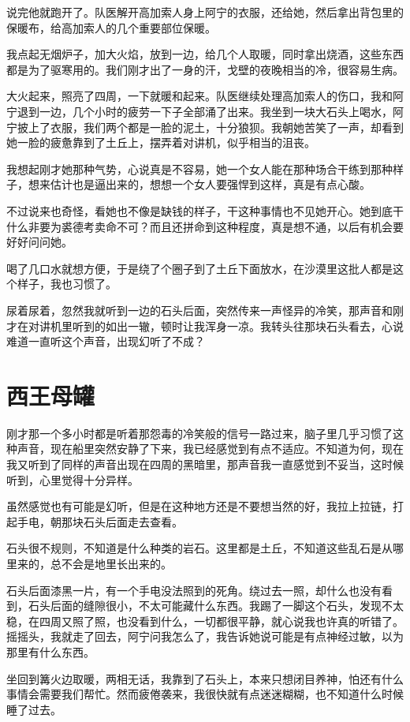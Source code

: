 说完他就跑开了。队医解开高加索人身上阿宁的衣服，还给她，然后拿出背包里的保暖布，给高加索人的几个重要部位保暖。

我点起无烟炉子，加大火焰，放到一边，给几个人取暖，同时拿出烧酒，这些东西都是为了驱寒用的。我们刚才出了一身的汗，戈壁的夜晚相当的冷，很容易生病。

大火起来，照亮了四周，一下就暖和起来。队医继续处理高加索人的伤口，我和阿宁退到一边，几个小时的疲劳一下子全部涌了出来。我坐到一块大石头上喝水，阿宁披上了衣服，我们两个都是一脸的泥土，十分狼狈。我朝她苦笑了一声，却看到她一脸的疲惫靠到了土丘上，摆弄着对讲机，似乎相当的沮丧。

我想起刚才她那种气势，心说真是不容易，她一个女人能在那种场合干练到那种样子，想来估计也是逼出来的，想想一个女人要强悍到这样，真是有点心酸。

不过说来也奇怪，看她也不像是缺钱的样子，干这种事情也不见她开心。她到底干什么非要为裘德考卖命不可？而且还拼命到这种程度，真是想不通，以后有机会要好好问问她。

喝了几口水就想方便，于是绕了个圈子到了土丘下面放水，在沙漠里这批人都是这个样子，我也习惯了。

尿着尿着，忽然我就听到一边的石头后面，突然传来一声怪异的冷笑，那声音和刚才在对讲机里听到的如出一辙，顿时让我浑身一凉。我转头往那块石头看去，心说难道一直听这个声音，出现幻听了不成？

\chapter{西王母罐}

刚才那一个多小时都是听着那怨毒的冷笑般的信号一路过来，脑子里几乎习惯了这种声音，现在船里突然安静了下来，我已经感觉到有点不适应。不知道为何，现在我又听到了同样的声音出现在四周的黑暗里，那声音我一直感觉到不妥当，这时候听到，心里觉得十分异样。

虽然感觉也有可能是幻听，但是在这种地方还是不要想当然的好，我拉上拉链，打起手电，朝那块石头后面走去查看。

石头很不规则，不知道是什么种类的岩石。这里都是土丘，不知道这些乱石是从哪里来的，总不会是地里长出来的。

石头后面漆黑一片，有一个手电没法照到的死角。绕过去一照，却什么也没有看到，石头后面的缝隙很小，不太可能藏什么东西。我踢了一脚这个石头，发现不太稳，在四周又照了照，也没看到什么，一切都很平静，就心说我也许真的听错了。摇摇头，我就走了回去，阿宁问我怎么了，我告诉她说可能是有点神经过敏，以为那里有什么东西。

坐回到篝火边取暖，两相无话，我靠到了石头上，本来只想闭目养神，怕还有什么事情会需要我们帮忙。然而疲倦袭来，我很快就有点迷迷糊糊，也不知道什么时候睡了过去。

